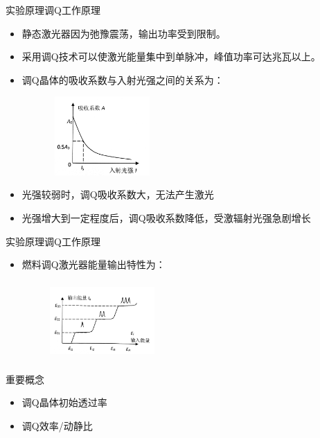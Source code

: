 \documentclass{beamer}
\begin{document}
\begin{frame}{实验原理}{调Q工作原理}
  \begin{itemize}
    \item 静态激光器因为弛豫震荡，输出功率受到限制。
    \item 采用调Q技术可以使激光能量集中到单脉冲，峰值功率可达兆瓦以上。
    \item 调Q晶体的吸收系数与入射光强之间的关系为：
    \begin{figure}
      \includegraphics[height=3cm,width=4cm]{images/4.jpg}
      \label{fg2}
    \end{figure}
  \end{itemize}
  


  \begin{itemize}
    \item 光强较弱时，调Q吸收系数大，无法产生激光
    \item 光强增大到一定程度后，调Q吸收系数降低，受激辐射光强急剧增长
  \end{itemize}
  
\end{frame}

\begin{frame}{实验原理}{调Q工作原理}
  \begin{itemize}
    \item 燃料调Q激光器能量输出特性为：
    \begin{figure}
      \includegraphics[height=3cm,width=4cm]{images/5.jpg}
      \label{fg2}
    \end{figure}
  \end{itemize}
  

\begin{block}{重要概念}
  \begin{itemize}
    \item 调Q晶体初始透过率
    \item 调Q效率/动静比
  \end{itemize}
\end{block}
  
\end{frame}
\end{document}
